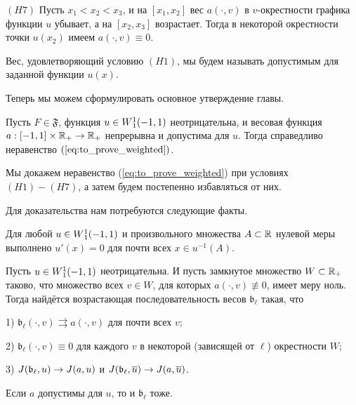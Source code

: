 \bigskip
\noindent
$(H7)$ Пусть $x_1 < x_2 < x_3$,
и на $[x_1, x_2]$ вес $a(\cdot, v)$ в $v$-окрестности графика функции $u$ убывает,
а на $[x_2, x_3]$ возрастает.
Тогда в некоторой окрестности точки $u(x_2)$ имеем $a(\cdot, v) \equiv 0$.

\bigskip

Вес, удовлетворяющий условию $(H1)$, мы будем называть допустимым для заданной функции $u(x)$.

\medskip

Теперь мы можем сформулировать основное утверждение главы.
\begin{thm}
\label{thm:unbounded_growth}
Пусть $F \in \mathfrak{F}$, функция $u \in W{}_1^1(-1, 1)$ неотрицательна,
и весовая функция $a: [-1, 1] \times \mathbb R_+ \to \mathbb R_+$ непрерывна
и допустима для $u$.
Тогда справедливо неравенство $(\ref{eq:to_prove_weighted})$.
\end{thm}

Мы докажем неравенство (\ref{eq:to_prove_weighted}) при условиях $(H1)-(H7)$,
а затем будем постепенно избавляться от них.

Для доказательства нам потребуются следующие факты.

\begin{prop}
\label{prop:level_derivative}
\textrm{\cite[теорема 6.19]{LiebLoss} }
Для любой $u \in W{}_1^1(-1, 1)$ и произвольного множества $A \subset \mathbb R$ нулевой меры выполнено
$u'(x) = 0$ для почти всех $x \in u^{-1}(A)$.
\end{prop}

\begin{lm}
\label{lm:approx_with_zero_stripe}
Пусть $u \in W{}_1^1(-1, 1)$ неотрицательна.
И пусть замкнутое множество $W \subset \mathbb R_+$ таково, что множество всех $v \in W$, для которых $a(\cdot, v) \not\equiv 0$, имеет меру ноль.
Тогда найдётся возрастающая последовательность весов $\mathfrak b_{\ell}$ такая, что

1) $\mathfrak b_{\ell}(\cdot, v) \rightrightarrows a(\cdot, v)$ для почти всех $v$;

2) $\mathfrak b_{\ell}(\cdot, v) \equiv 0$ для каждого $v$ в некоторой (зависящей от $\ell$) окрестности $W$;

3) $J(\mathfrak b_{\ell}, u) \to J(a, u)$ и $\IWg(\mathfrak b_{\ell}, \mon{u}) \to \IWg(a, \mon{u})$.
\end{lm}

\begin{rem}
Если $a$ допустимы для $u$, то и $\mathfrak b_{\ell}$ тоже.
\end{rem}

